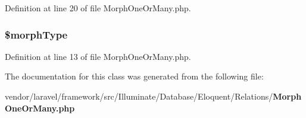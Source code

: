 Definition at line 20 of file Morph\+One\+Or\+Many.\+php.

\subsubsection[{\$morph\+Type}]{\setlength{\rightskip}{0pt plus 5cm}\$morph\+Type\hspace{0.3cm}{\ttfamily [protected]}}\label{class_illuminate_1_1_database_1_1_eloquent_1_1_relations_1_1_morph_one_or_many_a360c5e4b8e71ab470bf958957a6f741a}


Definition at line 13 of file Morph\+One\+Or\+Many.\+php.



The documentation for this class was generated from the following file\+:\begin{DoxyCompactItemize}
\item 
vendor/laravel/framework/src/\+Illuminate/\+Database/\+Eloquent/\+Relations/{\bf Morph\+One\+Or\+Many.\+php}\end{DoxyCompactItemize}
